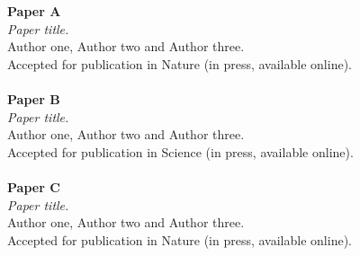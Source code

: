 \documentclass[twoside,openright,11pt]{book}
\begin{document}
%
%


\pagestyle{plain}

 
\newpage

 
\clearpage %

\cleardoublepage

\cleardoublepage %


\cleardoublepage %


\cleardoublepage %

\tableofcontents

 
\noindent 
\textbf{Paper A} \\
\textsl{Paper title.} \\
Author one, Author two and Author three.\\
Accepted for publication in Nature (in press, available online). \\ \\
\textbf{Paper B} \\
\textsl{Paper title.} \\
Author one, Author two and Author three.\\
Accepted for publication in Science (in press, available online). \\ \\
\textbf{Paper C} \\
\textsl{Paper title.} \\
Author one, Author two and Author three.\\
Accepted for publication in Nature (in press, available online). \\ \\
\end{document}
